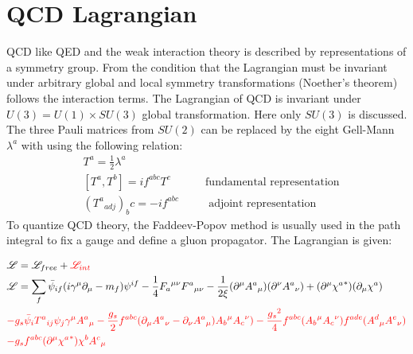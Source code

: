 \section{QCD Lagrangian}

QCD like QED and the weak interaction theory is described by representations of a symmetry group. From the condition that the Lagrangian must be invariant under arbitrary global and local symmetry transformations (Noether’s theorem) follows the interaction terms.
The Lagrangian of QCD is invariant under $ U(3) = U(1) \times SU(3) $ global transformation. Here only $ SU(3) $ is discussed. The three Pauli matrices from $ SU(2) $ can be replaced by the eight Gell-Mann $ \lambda^a $ with using the following relation: 
\begin{equation}
\begin{split}
&T^a = \frac{1}{2} \lambda^a\\
&[T^a, T^b]= if^{abc} T^c \:\:\:\:\:\:\:\:\:\:\:\:\:\:\text{fundamental representation}\\
&({T^a}_{adj})_bc = -if^{abc} \:\:\:\:\:\:\:\:\:\:\:\:\text{adjoint representation}
\end{split}
\end{equation}
To quantize QCD theory, the Faddeev-Popov method \cite{Faddeev:1967fc} is usually used in the path integral to fix a gauge and define a gluon propagator. The Lagrangian is given:

\begin{equation}
\begin{split}
& \mathscr{L} = \mathscr{L}_{free}+{\color[RGB]{255,0,0} \mathscr{L}_{int}}\\
& \mathscr{L} = \sum_f \bar{\psi}_{if} (i\gamma^{\mu} {\partial}_{\mu}-m_f){\psi}^{if}-\frac{1}{4}{F_a}^{\mu \nu}{F^a}_{\mu \nu}-\frac{1}{2\xi}(\partial^{\mu} {A^a}_{\mu})(\partial^{\nu} {A^a}_{\nu})+(\partial^{\mu} {\chi^a}^*)(\partial_{\mu} {\chi^a})\\
&{\color[RGB]{255,0,0} -g_s \bar{\psi}_{i} {T^a}_{ij}{\psi}_{j} \gamma^{\mu} {A^a}_{\mu}-\frac{g_s}{2} f^{abc}(\partial_{\mu} {A^a}_{\nu}-\partial_{\nu} {A^a}_{\mu}){A_b}^{\mu}{A_c}^{\nu})-\frac{{g_s}^2}{4} f^{abc} ({A_b}^{\mu}{A_c}^{\nu})f^{ade} ({A^d}_{\mu} {A^e}_{\nu})}\\
&{\color[RGB]{255,0,0} -g_s f^{abc} (\partial^{\mu} {\chi^a}^{*}){\chi^b}{A^c}_{\mu}}\\
\end{split}
\end{equation}

